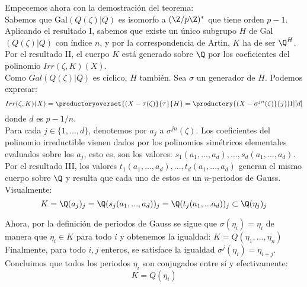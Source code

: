 \documentclass[a5paper]{article}
\begin{document}
{
	Empecemos ahora con la demostración del teorema:\\
	Sabemos que Gal$(Q(\zeta)|Q)$ es isomorfo a $(\Z/p\Z)^*$ que tiene orden $p-1$. Aplicando el resultado I, sabemos que existe un único subgrupo $H$  de Gal$(Q(\zeta)|Q)$ con índice $n$, y por la correspondencia de Artin, $K$ ha de ser $\Q^H$.\\

	Por el resultado II, el cuerpo $K$ está generado sobre $\Q$ por los coeficientes
	del polinomio $Irr(\zeta,K)(X)$.\\
	Como $Gal (Q(\zeta)|Q)$ es cíclico, $H$ también. Sea $\sigma$ un generador de $H$. Podemos expresar:
	$$ Irr(\zeta,K)(X) = \productoryoverset{(X-\tau(\zeta)}{\tau}{H} = \productory{ (X-\sigma^{jn}(\zeta) }{ j }[ 1 ][ d ] $$
	donde $d$ es $p-1/n$. \\

	Para cada $j \in \{1,...,d\}$, denotemos por $a_j$ a $\sigma^{jn}(\zeta)$. Los coeficientes del polinomio irreductible vienen dados por los polinomios simétricos elementales evaluados sobre los $a_j$, esto es, son los valores: $s_1(a_1,...,a_d),...,s_d(a_1,...,a_d)$.\\
	Por el resultado III, los valores $t_1(a_1,...,a_d),...,t_d(a_1,...,a_d)$ generan el mismo cuerpo sobre $\Q$ y resulta que cada uno de estos es un $n$-periodos de Gauss. Visualmente:
	$$ K = \Q(a_j)_j = \Q(s_j(a_1,...,a_d))_j = \Q(t_j(a_1,...a_d))_j \subset \Q(\eta_j)_j$$

	Ahora, por la definición de periodos de Gauss se sigue que $\sigma(\eta_i) = \eta_i$ de manera que $\eta_i \in K$ para todo $i$ y obtenemos la igualdad: $K = Q(\eta_1, . . . , \eta_n)$\\
	Finalmente, para todo $i,j$ enteros, se satisface la igualdad $\sigma^j(\eta_i) = \eta_{i+j}$. Concluimos que todos los periodos $\eta_i$ son conjugados entre sí y efectivamente: $$K = Q(\eta_i)$$}
\end{document}
